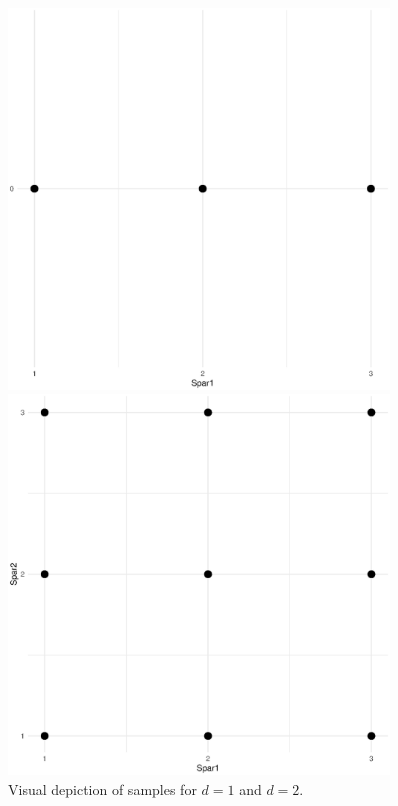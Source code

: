 \documentclass{article}
\begin{document}
\begin{figure}[!ht]
  \centering
  \begin{minipage}{0.45\textwidth}
    \includegraphics[width=0.9\textwidth]{../../images/points1}
  \end{minipage} %
  \begin{minipage}{0.45\textwidth}
    \includegraphics[width=0.9\textwidth]{../../images/points2}
  \end{minipage}
  \caption{Visual depiction of samples for $d=1$ and $d=2$.}
  \label{fig:samples}
\end{figure}
\end{document}

